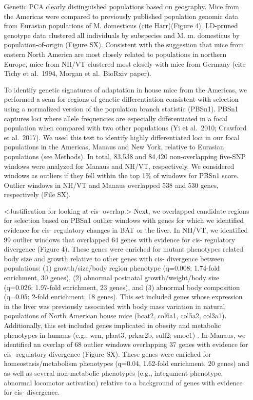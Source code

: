 \documentclass[9pt,twocolumn,twoside,lineno]{pnas-new}
\begin{document}
Genetic PCA clearly distinguished populations based on geography. Mice
from the Americas were compared to previously published population
genomic data from Eurasian populations of M. domesticus (cite
Harr)(Figure 4). LD-pruned genotype data clustered all individuals by
subspecies and M. m. domesticus by population-of-origin (Figure SX).
Consistent with the suggestion that mice from eastern North America are
most closely related to populations in northern Europe, mice from NH/VT
clustered most closely with mice from Germany (cite Tichy et al.~1994,
Morgan et al.~BioRxiv paper).

To identify genetic signatures of adaptation in house mice from the
Americas, we performed a scan for regions of genetic differentiation
consistent with selection using a normalized version of the population
branch statistic (PBSn1). PBSn1 captures loci where allele frequencies
are especially differentiated in a focal population when compared with
two other populations (Yi et al.~2010; Crawford et al.~2017). We used
this test to identify highly differentiated loci in our focal
populations in the Americas, Manaus and New York, relative to Eurasian
populations (see Methods). In total, 83,538 and 84,420 non-overlapping
five-SNP windows were analyzed for Manaus and NH/VT, respectively. We
considered windows as outliers if they fell within the top 1\% of
windows for PBSn1 score. Outlier windows in NH/VT and Manaus overlapped
538 and 530 genes, respectively (File SX).

\textless Justification for looking at cis- overlap.\textgreater{} Next,
we overlapped candidate regions for selection based on PBSn1 outlier
windows with genes for which we identified evidence for cis- regulatory
changes in BAT or the liver. In NH/VT, we identified 99 outlier windows
that overlapped 64 genes with evidence for cis- regulatory divergence
(Figure 4). These genes were enriched for mutant phenotypes related body
size and growth relative to other genes with cis- divergence between
populations: (1) growth/size/body region phenotype (q=0.008; 1.74-fold
enrichment, 30 genes), (2) abnormal postnatal growth/weight/body size
(q=0.026; 1.97-fold enrichment, 23 genes), and (3) abnormal body
composition (q=0.05; 2-fold enrichment, 18 genes). This set included
genes whose expression in the liver was previously associated with body
mass variation in natural populations of North American house mice
(bcat2, col6a1, col5a2, col3a1). Additionally, this set included genes
implicated in obesity and metabolic phenotypes in humans (e.g., wrn,
plaat3, prkar2b, sulf2, smoc1) . In Manaus, we identified an overlap of
68 outlier windows overlapping 37 genes with evidence for cis-
regulatory divergence (Figure SX). These genes were enriched for
homeostasis/metabolism phenotypes (q=0.04, 1.62-fold enrichment, 20
genes) and as well as several non-metabolic phenotypes (e.g., integument
phenotype, abnormal locomotor activation) relative to a background of
genes with evidence for cis- divergence.
\end{document}
